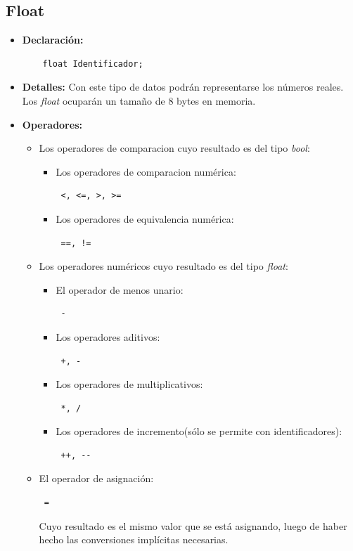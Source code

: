 \documentclass[11pt, spanish]{report}
\begin{document}
\subsection{Float}

\begin{itemize}
\item \textbf{Declaraci\'on:}
  \begin{verbatim}
    float Identificador;
  \end{verbatim}
\item \textbf{Detalles:}
  Con este tipo de datos podr\'an representarse los n\'umeros reales. Los \emph{float} ocupar\'an un tama\~no de 8 bytes en memoria.\\
\item \textbf{Operadores:}
  \begin{itemize}
  \item Los operadores de comparacion cuyo resultado es del tipo \emph{bool}: 
    \begin{itemize}
    \item Los operadores de comparacion num\'erica: \begin{verbatim} <, <=, >, >= \end{verbatim}
    \item Los operadores de equivalencia num\'erica: \begin{verbatim} ==, != \end{verbatim}
    \end{itemize}
  \item Los operadores num\'ericos cuyo resultado es del tipo \emph{float}:
    \begin{itemize}
    \item El operador de menos unario: \begin{verbatim} - \end{verbatim}
    \item Los operadores aditivos: \begin{verbatim} +, - \end{verbatim}
    \item Los operadores de multiplicativos: \begin{verbatim} *, / \end{verbatim}
    \item Los operadores de incremento(s\'olo se permite con identificadores): \begin{verbatim} ++, -- \end{verbatim}
    \end{itemize}
  \item El operador de asignaci\'on:
    \begin{verbatim} = \end{verbatim}
    Cuyo resultado es el mismo valor que se est\'a asignando, luego de haber hecho las conversiones impl\'icitas necesarias.
  \end{itemize}
\end{itemize}
\end{document}
